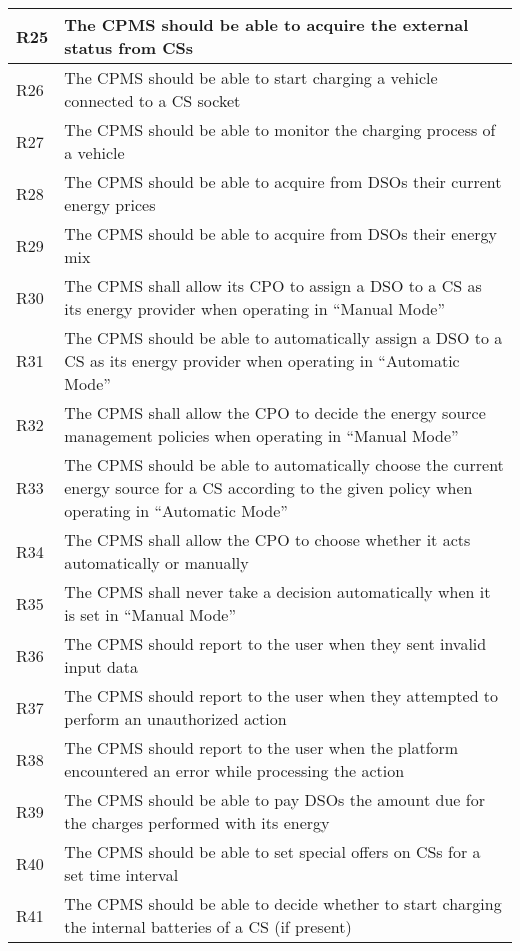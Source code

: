\documentclass[11pt]{article}
\begin{document}
\begin{table}[H]
\begin{tabularx}{\textwidth}{|>{\centering\hsize=0.1\hsize}X|>{\hsize=1.9\hsize}X|}
        \hline
        R25 & The CPMS should be able to acquire the external status from CSs \\
        \hline
        R26 & The CPMS should be able to start charging a vehicle connected to a CS socket \\
        \hline
        R27 & The CPMS should be able to monitor the charging process of a vehicle \\
        \hline
        R28 & The CPMS should be able to acquire from DSOs their current energy prices \\
        \hline
        R29 & The CPMS should be able to acquire from DSOs their energy mix \\
        \hline
        R30 & The CPMS shall allow its CPO to assign a DSO to a CS as its energy provider  when operating in “Manual Mode” \\
        \hline
        R31 & The CPMS should be able to automatically assign a DSO to a CS as its energy provider when operating in “Automatic Mode” \\
        \hline
        R32 & The CPMS shall allow the CPO to decide the energy source management policies when operating in “Manual Mode” \\
        \hline
        R33 & The CPMS should be able to automatically choose the current energy source for a CS according to the given policy when operating in “Automatic Mode” \\
        \hline
        R34 & The CPMS shall allow the CPO to choose whether it acts automatically or manually \\
        \hline
        R35 & The CPMS shall never take a decision automatically when it is set in “Manual Mode” \\
        \hline
        R36 & The CPMS should report to the user when they sent invalid input data \\
        \hline
        R37 & The CPMS should report to the user when they attempted to perform an unauthorized action \\
        \hline
        R38 & The CPMS should report to the user when the platform encountered an error while processing the action \\
        \hline
        R39 & The CPMS should be able to pay DSOs the amount due for the charges performed with its energy \\
        \hline
        R40 & The CPMS should be able to set special offers on CSs for a set time interval \\
        \hline
        R41 & The CPMS should be able to decide whether to start charging the internal batteries of a CS (if present) \\
        \hline
    \end{tabularx}
    \label{tab:requirements-2}
\end{table}
\end{document}
